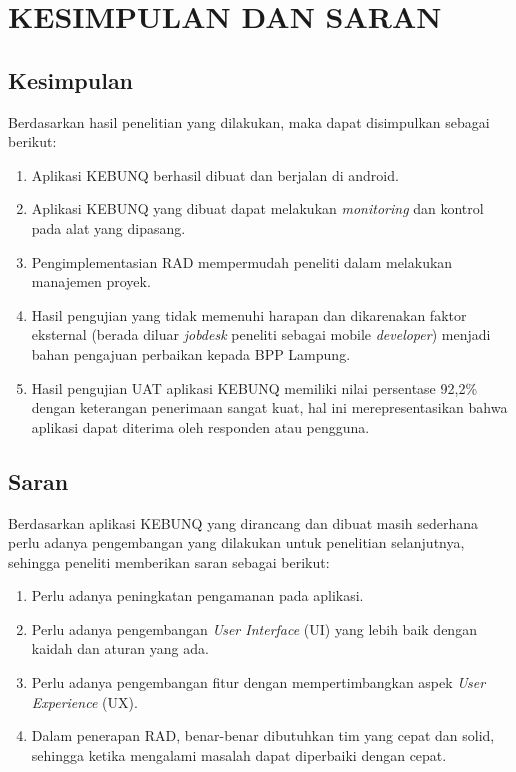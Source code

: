 \chapter{KESIMPULAN DAN SARAN}

%
\vspace{4.5pt}

\begin{flushleft}
    \begin{justify}
        \section{Kesimpulan}
        Berdasarkan hasil penelitian yang dilakukan, maka dapat disimpulkan sebagai berikut:
        \begin{enumerate}
            \item Aplikasi KEBUNQ berhasil dibuat dan berjalan di android.
            \item Aplikasi KEBUNQ yang dibuat dapat melakukan \emph{monitoring} dan kontrol pada alat yang dipasang.
            \item Pengimplementasian RAD mempermudah peneliti dalam melakukan manajemen proyek.
            \item Hasil pengujian yang tidak memenuhi harapan dan dikarenakan faktor eksternal (berada diluar \emph{jobdesk} peneliti sebagai mobile \emph{developer}) 
            menjadi bahan pengajuan perbaikan kepada BPP Lampung. 
            \item Hasil pengujian UAT aplikasi KEBUNQ memiliki nilai persentase 92,2\% dengan keterangan penerimaan sangat kuat, hal ini merepresentasikan bahwa aplikasi dapat diterima oleh responden atau pengguna.\\
        \end{enumerate}

        \section{Saran}
        Berdasarkan aplikasi KEBUNQ yang dirancang dan dibuat masih sederhana perlu adanya pengembangan yang dilakukan untuk penelitian selanjutnya, sehingga peneliti memberikan saran sebagai berikut:
        \begin{enumerate}
            \item Perlu adanya peningkatan pengamanan pada aplikasi.
            \item Perlu adanya pengembangan \emph{User Interface} (UI) yang lebih baik dengan kaidah dan aturan yang ada.
            \item Perlu adanya pengembangan fitur dengan mempertimbangkan aspek \emph{User Experience} (UX).
            \item Dalam penerapan RAD, benar-benar dibutuhkan tim yang cepat dan solid, sehingga ketika mengalami masalah dapat diperbaiki dengan cepat.
        \end{enumerate}

            
    \end{justify}
        
\end{flushleft}

\newpage